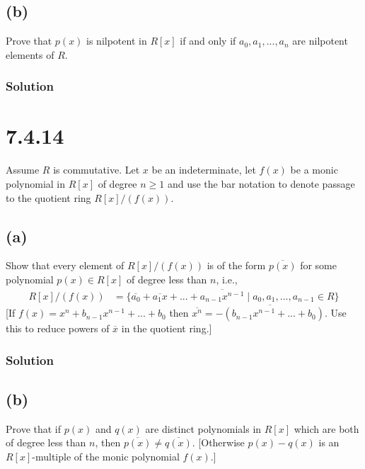 \documentclass[fleqn]{article}
\begin{document}
        
        \subsection{(b)}
        Prove that $p(x)$ is nilpotent in $R[x]$ if and only if $a_0, a_1, ..., a_n$ are nilpotent elements of $R$.
        
            \subsubsection{Solution}
            
    
    \section{7.4.14}
    Assume $R$ is commutative.  Let $x$ be an indeterminate, let $f(x)$ be a monic polynomial in $R[x]$ of degree $n \geq 1$ and use the bar notation to denote passage to the quotient ring $R[x]/(f(x))$.
        
        \subsection{(a)}
        Show that every element of $R[x]/(f(x))$ is of the form $\overline{p(x)}$ for some polynomial $p(x) \in R[x]$ of degree less than $n$, i.e., 
        \begin{align}
            R[x]/(f(x)) &= \{\overline{a_0} + \overline{a_1 x} + ... + \overline{a_{n - 1} x^{n - 1}} \mid a_0, a_1, ..., a_{n - 1} \in R\}
        \end{align}
        [If $f(x) = x^n + b_{n - 1} x^{n - 1} + ... + b_0$ then $\overline{x^n} = \overline{-(b_{n - 1} x^{n - 1} + ... + b_0)}$.  Use this to reduce powers of $\overline{x}$ in the quotient ring.]
            
            \subsubsection{Solution}
            
        
        \subsection{(b)}
        Prove that if $p(x)$ and $q(x)$ are distinct polynomials in $R[x]$ which are both of degree less than $n$, then $\overline{p(x)} \neq \overline{q(x)}$.  [Otherwise $p(x) - q(x)$ is an $R[x]$-multiple of the monic polynomial $f(x)$.]
            
\end{document}

